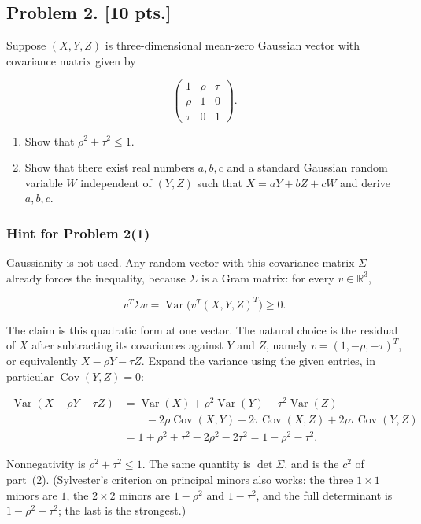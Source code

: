 \documentclass[11pt,a4paper]{article}
\DeclareMathOperator{\Var}{Var}
\begin{document}
\subsection{Problem 2. [10 pts.]}
Suppose \( (X, Y, Z) \) is three-dimensional mean-zero Gaussian vector with covariance matrix given by

\[
\begin{pmatrix}
1 & \rho & \tau \\
\rho & 1 & 0 \\
\tau & 0 & 1
\end{pmatrix}.
\]

\begin{enumerate}[label=(\arabic*)]
    \item Show that \( \rho^2 + \tau^2 \le 1 \).
    \item Show that there exist real numbers \( a, b, c \) and a standard Gaussian random variable \( W \) independent of \( (Y, Z) \) such that \( X = aY + bZ + cW \) and derive \( a, b, c \).
\end{enumerate}

\setcounter{section}{2}

\subsubsection{Hint for Problem 2(1)}

Gaussianity is not used. Any random vector with this covariance matrix \(\Sigma\) already forces the inequality, because \(\Sigma\) is a Gram matrix: for every \( v\in\mathbb{R}^{3} \),

\[
v^{T}\Sigma v
=
\Var\bigl(v^{T}(X,Y,Z)^{T}\bigr)
\ge 0.
\]

The claim is this quadratic form at one vector. The natural choice is the residual of \( X \) after subtracting its covariances against \( Y \) and \( Z \), namely \( v=(1,-\rho,-\tau)^{T} \), or equivalently \( X-\rho Y-\tau Z \). Expand the variance using the given entries, in particular \(\operatorname{Cov}(Y,Z)=0\):

\[
\begin{aligned}
\Var(X-\rho Y-\tau Z)
&=
\Var(X)+\rho^{2}\Var(Y)+\tau^{2}\Var(Z)\\
&\qquad
-2\rho\operatorname{Cov}(X,Y)
-2\tau\operatorname{Cov}(X,Z)
+2\rho\tau\operatorname{Cov}(Y,Z)\\
&=
1+\rho^{2}+\tau^{2}-2\rho^{2}-2\tau^{2}
=
1-\rho^{2}-\tau^{2}.
\end{aligned}
\]

Nonnegativity is \( \rho^{2}+\tau^{2}\le 1 \). The same quantity is \( \det\Sigma \), and is the \( c^{2} \) of part~(2). (Sylvester's criterion on principal minors also works: the three \( 1\times 1 \) minors are \( 1 \), the \( 2\times 2 \) minors are \( 1-\rho^{2} \) and \( 1-\tau^{2} \), and the full determinant is \( 1-\rho^{2}-\tau^{2} \); the last is the strongest.)
\end{document}
